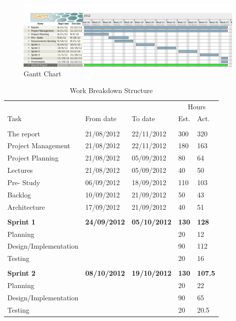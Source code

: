 \begin{figure}
\centering
\includegraphics[width=6in]{image/gantt.png}
\caption{Gantt Chart}
\label{figure:gantt}
\end{figure}

\begin{table}
\caption{Work Breakdown Structure}
\centering
\begin{tabular}{ l l l l l }
\hline 
			&				&				&\multicolumn{2}{c}{Hours}		\\
 Task		& From date		&To date			&Est.			&Act.	                \\ 
\hline \\ [-2.0ex]
 The report     			&21/08/2012		&22/11/2012		&300		&320         	 \\
 Project Management	&21/08/2012		&22/11/2012		&180		&163		\\
 Project Planning		&21/08/2012		&05/09/2012		&80			&64		\\
 Lectures				&21/08/2012		&05/09/2012		&40			&50		\\	
 Pre- Study			&06/09/2012		&18/09/2012		&110		&103		\\
 Backlog				&10/09/2012		&21/09/2012		&50			&43		\\
 Architecture			&17/09/2012		&21/09/2012		&40			&51		\\
\hline \\ [-2.0ex]
 \bf{Sprint 1}			&\bf{24/09/2012}	&\bf{05/10/2012}	&\bf{130}		&\bf{128}	\\
 Planning				&				&				&20			&12		\\
 Design/Implementation	&				&				&90			&112	\\
 Testing				&				&				&20			&16		\\
\hline \\ [-2.0ex]
 \bf{Sprint 2}			&\bf{08/10/2012}	&\bf{19/10/2012}	&\bf{130}		&\bf{107.5}	\\
 Planning				&				&				&20			&22			\\
 Design/Implementation	&				&				&90			&65			\\
 Testing				&				&				&20			&20.5		\\

\end{tabular}
\end{table}
